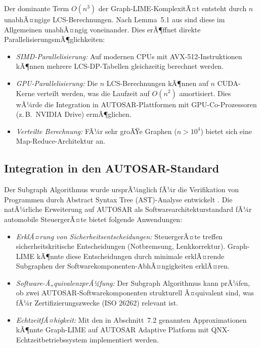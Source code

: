 ﻿\documentclass[a4paper,12pt]{article}
\theoremstyle{definition}
\begin{document}
Der dominante Term $O(n^3)$ der Graph-LIME-KomplexitÃ¤t entsteht durch $n$
unabhÃ¤ngige LCS-Berechnungen.
Nach Lemma~5.1 aus \citet{Epp2026} sind diese im Allgemeinen unabhÃ¤ngig voneinander.
Dies erÃ¶ffnet direkte ParallelisierungsmÃ¶glichkeiten:

\begin{itemize}
  \item \emph{SIMD-Parallelisierung:} Auf modernen CPUs mit AVX-512-Instruktionen
        kÃ¶nnen mehrere LCS-DP-Tabellen gleichzeitig berechnet werden.
  \item \emph{GPU-Parallelisierung:} Die $n$ LCS-Berechnungen kÃ¶nnen auf $n$
        CUDA-Kerne verteilt werden, was die Laufzeit auf
        $O(n^2)$ amortisiert.
        Dies wÃ¼rde die Integration in AUTOSAR-Plattformen mit GPU-Co-Prozessoren
        (z.\,B.\ NVIDIA Drive) ermÃ¶glichen.
  \item \emph{Verteilte Berechnung:} FÃ¼r sehr groÃŸe Graphen ($n > 10^4$) bietet
        sich eine Map-Reduce-Architektur an.
\end{itemize}

\subsection{Integration in den AUTOSAR-Standard}

Der Subgraph Algorithmus wurde ursprÃ¼nglich fÃ¼r die Verifikation von
Programmen durch Abstract Syntax Tree (AST)-Analyse entwickelt \citep{Epp2026}.
Die natÃ¼rliche Erweiterung auf AUTOSAR \citep{AUTOSAR2023} als
Softwarearchitekturstandard fÃ¼r automobile SteuergerÃ¤te bietet
folgende Anwendungen:

\begin{itemize}
  \item \emph{ErklÃ¤rung von Sicherheitsentscheidungen:} SteuergerÃ¤te treffen
        sicherheitskritische Entscheidungen (Notbremsung, Lenkkorrektur).
        Graph-LIME kÃ¶nnte diese Entscheidungen durch minimale erklÃ¤rende
        Subgraphen der Softwarekomponenten-AbhÃ¤ngigkeiten erklÃ¤ren.
  \item \emph{Software-Ã„quivalenzprÃ¼fung:} Der Subgraph Algorithmus kann
        prÃ¼fen, ob zwei AUTOSAR-Softwarekomponenten strukturell Ã¤quivalent sind,
        was fÃ¼r Zertifizierungszwecke (ISO 26262) relevant ist.
  \item \emph{EchtzeitfÃ¤higkeit:} Mit den in Abschnitt~7.2 genannten
        Approximationen kÃ¶nnte Graph-LIME auf AUTOSAR Adaptive Platform mit
        QNX-Echtzeitbetriebssystem implementiert werden.
\end{itemize}
\end{document}
